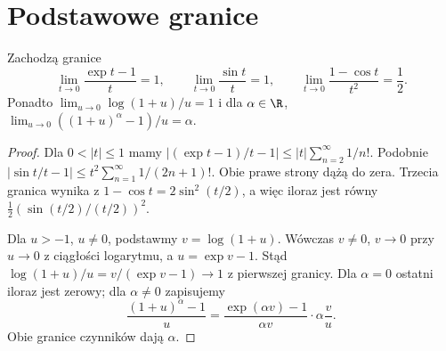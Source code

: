 \section{Podstawowe granice}
\begin{twierdzenie}
\label{ma1:thm:elementary-limits}
Zachodzą granice
\[
 \lim_{t\to0}\frac{\exp t-1}{t}=1,\qquad
 \lim_{t\to0}\frac{\sin t}{t}=1,\qquad
 \lim_{t\to0}\frac{1-\cos t}{t^2}=\frac12.
\]
Ponadto $\lim_{u\to0}\log(1+u)/u=1$ i dla $\alpha\in\R$,
$\lim_{u\to0}((1+u)^\alpha-1)/u=\alpha$.
\end{twierdzenie}
\begin{proof}
Dla $0<|t|\le1$ mamy
$|(\exp t-1)/t-1|\le |t|\sum_{n=2}^\infty1/n!$.
Podobnie $|\sin t/t-1|\le t^2\sum_{n=1}^\infty1/(2n+1)!$.
Obie prawe strony dążą do zera. Trzecia granica wynika z $1-\cos t=2\sin^2(t/2)$, a więc iloraz jest równy $\tfrac12(\sin(t/2)/(t/2))^2$.

Dla $u>-1$, $u\ne0$, podstawmy $v=\log(1+u)$. Wówczas $v\ne0$, $v\to0$ przy $u\to0$ z ciągłości logarytmu, a $u=\exp v-1$. Stąd $\log(1+u)/u=v/(\exp v-1)\to1$ z pierwszej granicy. Dla $\alpha=0$ ostatni iloraz jest zerowy; dla $\alpha\ne0$ zapisujemy
\[
 \frac{(1+u)^\alpha-1}{u}
 =\frac{\exp(\alpha v)-1}{\alpha v}\cdot\alpha\frac vu.
\]
Obie granice czynników dają $\alpha$.
\end{proof}

